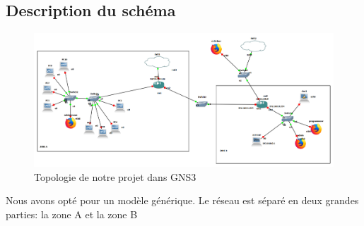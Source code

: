 \documentclass[a4paper,12pt,french]{report} %
\begin{document}
\subsection{Description du schéma}
\begin{figure}[H]
\centering
\includegraphics[width=19cm]{figure/topologie_gns3.png}
\caption{Topologie de notre projet dans GNS3}	
\end{figure}	
Nous avons opté pour un modèle générique. Le réseau est séparé en deux grandes parties: la zone A et la zone B
\end{document}
